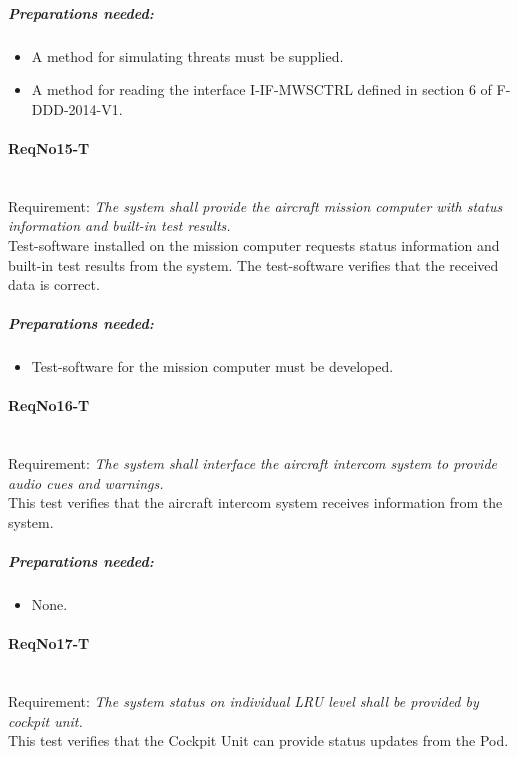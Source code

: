	\subparagraph{Preparations needed:}
	\begin{itemize}
	\item A method for simulating threats must be supplied.
	\item A method for reading the interface I-IF-MWSCTRL defined in section 6 of F-DDD-2014-V1.
	\end{itemize} 


\paragraph{ReqNo15-T}\mbox{}\\ %
Requirement: \textit{The system shall provide the aircraft mission computer
with status information and built-in test results.}
\\
Test-software installed on the mission computer requests status information and built-in test results from the system. The test-software verifies that the received data is correct.
\\
	\subparagraph{Preparations needed:}
	\begin{itemize}
	\item Test-software for the mission computer must be developed.
	\end{itemize} 

\paragraph{ReqNo16-T}\mbox{}\\ %
Requirement: \textit{The system shall interface the aircraft intercom system to provide audio cues and warnings.}
\\
This test verifies that the aircraft intercom system receives information from the system.
\\
	\subparagraph{Preparations needed:}
	\begin{itemize}
	\item None.
	\end{itemize} 


\paragraph{ReqNo17-T}\mbox{}\\ %
Requirement: \textit{The system status on individual LRU level shall be
provided by cockpit unit.}\\
This test verifies that the Cockpit Unit can provide status updates from the Pod.\\

